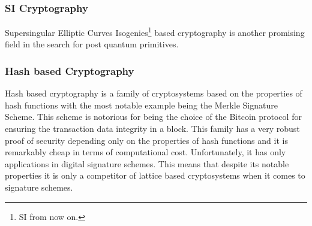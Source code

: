 \subsubsection{SI Cryptography}
Supersingular Elliptic Curves Isogenies\footnote{SI from now on.} based cryptography is another promising field in the search for post quantum primitives.

\subsubsection{Hash based Cryptography}
Hash based cryptography is a family of cryptosystems based on the properties of hash functions with the most notable example being the Merkle Signature Scheme. This scheme is notorious for being the choice of the Bitcoin protocol for ensuring the transaction data integrity in a block. This family has a very robust proof of security depending only on the properties of hash functions and it is remarkably cheap in terms of computational cost. Unfortunately, it has only applications in digital signature schemes. This means that despite its notable properties it is only a competitor of lattice based cryptosystems when it comes to signature schemes.